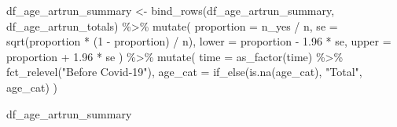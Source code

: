 \documentclass[
  letterpaper,
  DIV=11,
  numbers=noendperiod]{scrartcl}
\newenvironment{Shaded}{\begin{snugshade}}{\end{snugshade}}
\newcommand{\AttributeTok}[1]{\textcolor[rgb]{0.40,0.45,0.13}{#1}}
\newcommand{\DecValTok}[1]{\textcolor[rgb]{0.68,0.00,0.00}{#1}}
\newcommand{\FloatTok}[1]{\textcolor[rgb]{0.68,0.00,0.00}{#1}}
\newcommand{\FunctionTok}[1]{\textcolor[rgb]{0.28,0.35,0.67}{#1}}
\newcommand{\NormalTok}[1]{\textcolor[rgb]{0.00,0.23,0.31}{#1}}
\newcommand{\OtherTok}[1]{\textcolor[rgb]{0.00,0.23,0.31}{#1}}
\newcommand{\SpecialCharTok}[1]{\textcolor[rgb]{0.37,0.37,0.37}{#1}}
\newcommand{\StringTok}[1]{\textcolor[rgb]{0.13,0.47,0.30}{#1}}
\begin{document}
\begin{Shaded}
\begin{Highlighting}[]
\NormalTok{df\_age\_artrun\_summary }\OtherTok{\textless{}{-}} \FunctionTok{bind\_rows}\NormalTok{(df\_age\_artrun\_summary, df\_age\_artrun\_totals) }\SpecialCharTok{\%\textgreater{}\%}
  \FunctionTok{mutate}\NormalTok{(}
    \AttributeTok{proportion =}\NormalTok{ n\_yes }\SpecialCharTok{/}\NormalTok{ n,}
    \AttributeTok{se =} \FunctionTok{sqrt}\NormalTok{(proportion }\SpecialCharTok{*}\NormalTok{ (}\DecValTok{1} \SpecialCharTok{{-}}\NormalTok{ proportion) }\SpecialCharTok{/}\NormalTok{ n),}
    \AttributeTok{lower =}\NormalTok{ proportion }\SpecialCharTok{{-}} \FloatTok{1.96} \SpecialCharTok{*}\NormalTok{ se,}
    \AttributeTok{upper =}\NormalTok{ proportion }\SpecialCharTok{+} \FloatTok{1.96} \SpecialCharTok{*}\NormalTok{ se}
\NormalTok{  ) }\SpecialCharTok{\%\textgreater{}\%} 
  \FunctionTok{mutate}\NormalTok{(}
    \AttributeTok{time =} \FunctionTok{as\_factor}\NormalTok{(time) }\SpecialCharTok{\%\textgreater{}\%} 
      \FunctionTok{fct\_relevel}\NormalTok{(}\StringTok{"Before Covid{-}19"}\NormalTok{),}
    \AttributeTok{age\_cat =} \FunctionTok{if\_else}\NormalTok{(}\FunctionTok{is.na}\NormalTok{(age\_cat), }\StringTok{"Total"}\NormalTok{, age\_cat)}
\NormalTok{  )}

\NormalTok{df\_age\_artrun\_summary}
\end{Highlighting}
\end{Shaded}
\end{document}
